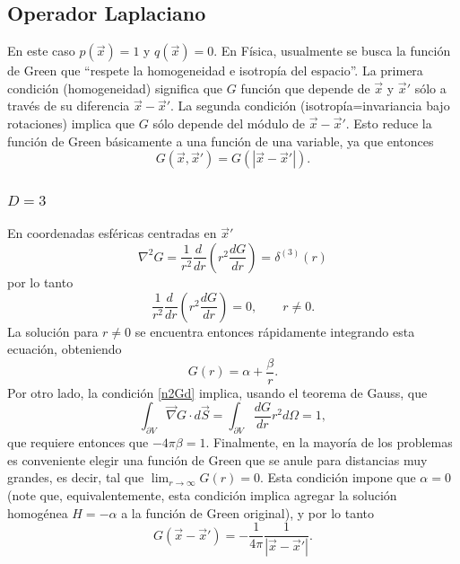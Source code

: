 \subsection{Operador Laplaciano}
En este caso $p(\vec{x})=1$ y $q(\vec{x})=0$. En Física, usualmente se busca la función de Green que ``respete la homogeneidad e isotropía del espacio''. La primera condición (homogeneidad) significa que $G$ función que depende de $\vec{x}$ y $\vec{x}'$ sólo a través de su diferencia $\vec{x}-\vec{x}'$. La segunda condición (isotropía=invariancia bajo rotaciones) implica que $G$ sólo depende del módulo de $\vec{x}-\vec{x}'$. Esto reduce la función de Green básicamente a una función de una variable, ya que entonces
\begin{equation}
G(\vec{x},\vec{x}')=G(|\vec{x}-\vec{x}'|).
\end{equation}

\subsubsection{$D=3$}
En coordenadas esféricas centradas en $\vec{x}'$
\begin{equation}\label{n2Gd}
\nabla^2G=\frac{1}{r^2}\frac{d\ }{dr}\left(r^2\frac{dG}{dr}\right)=\delta^{(3)}(r)
\end{equation}
por lo tanto 
\begin{equation}
\frac{1}{r^2}\frac{d\ }{dr}\left(r^2\frac{dG}{dr}\right)=0, \qquad r\neq 0.
\end{equation}
La solución para $r\neq 0$ se encuentra entonces rápidamente integrando esta ecuación, obteniendo
\begin{equation}
G(r)=\alpha+\frac{\beta}{r}.
\end{equation}
Por otro lado, la condición \eqref{n2Gd} implica, usando el teorema de Gauss, que
\begin{equation}
\int_{\partial V}\vec\nabla G\cdot d\vec{S}=\int_{\partial V}\frac{dG}{dr}r^2d\Omega=1,
\end{equation}
que requiere entonces que $-4\pi\beta=1$. Finalmente, en la mayoría de los problemas es conveniente elegir una función de Green que se anule para distancias muy grandes, es decir, tal que $\lim_{r\to\infty}G(r)=0$. Esta condición impone que $\alpha=0$ (note que, equivalentemente, esta condición implica agregar la solución homogénea $H=-\alpha$ a la función de Green original), y por lo tanto
\begin{equation}
\boxed{G(\vec{x}-\vec{x}')=-\frac{1}{4\pi}\frac{1}{|\vec{x}-\vec{x}'|}.}
\end{equation}

